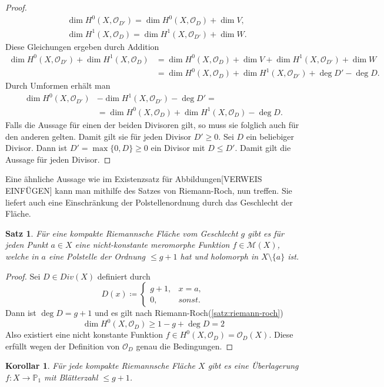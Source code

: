 \documentclass[11pt,a4paper]{scrartcl}
\theoremstyle{thm}
\newtheorem{satz}{Satz}[section]
\newtheorem{koro}{Korollar}[section]
\theoremstyle{def}
\theoremstyle{remark}
\begin{document}
\begin{proof}
\begin{align*}
&\dim H^0(X,\mathcal{O}_{D'})=\dim H^0(X,\mathcal{O}_D)+\dim V,\\
&\dim H^1(X,\mathcal{O}_D)=\dim H^1(X,\mathcal{O}_{D'})+\dim W.
\end{align*}
Diese Gleichungen ergeben durch Addition
\begin{align*}
	\dim H^0(X,\mathcal{O}_{D'})+\dim H^1(X,\mathcal{O}_D) &=\dim H^0(X,\mathcal{O}_D)+\dim V+\dim H^1(X,\mathcal{O}_{D'})+\dim W\\
	&=\dim H^0(X,\mathcal{O}_D)+\dim H^1(X,\mathcal{O}_{D'})+\deg D'-\deg D.
\end{align*}
Durch Umformen erhält man
\begin{align*}
\dim H^0(X,\mathcal{O}_{D'})&-\dim H^1(X,\mathcal{O}_{D'})-\deg D'=\\
							&=\dim H^0(X,\mathcal{O}_D)+\dim H^1(X,\mathcal{O}_D)-\deg D.	
\end{align*}
Falls die Aussage für einen der beiden Divisoren gilt, so muss sie folglich auch für den anderen gelten. Damit gilt sie für jeden Divisor $D'\geq 0$. Sei $D$ ein beliebiger Divisor. Dann ist $D'=\max \{0,D\}\geq 0$ ein Divisor mit $D\leq D'$. Damit gilt die Aussage für jeden Divisor.
\end{proof}
Eine ähnliche Aussage wie im Existenzsatz für Abbildungen[VERWEIS EINFÜGEN] kann man mithilfe des Satzes von Riemann-Roch, nun treffen. Sie liefert auch eine Einschränkung der Polstellenordnung durch das Geschlecht der Fläche.
\begin{satz}
	Für eine kompakte Riemannsche Fläche vom Geschlecht $g$ gibt es für jeden Punkt $a\in X$ eine nicht-konstante meromorphe Funktion $f\in \mathcal{M}(X)$, welche in $a$ eine Polstelle der Ordnung $\leq g+1$ hat und holomorph in $X\setminus\{a\}$ ist.
\end{satz} 
\begin{proof}
	Sei $D\in Div(X)$ definiert durch
	\[
		D(x)\coloneqq
	\begin{cases}
		g+1, &x=a,\\
		0, &sonst.
	\end{cases}
	\]
	Dann ist $\deg D = g+1$ und es gilt nach Riemann-Roch(\ref{satz:riemann-roch})
	\[
	\dim H^0(X,\mathcal{O}_D)\geq 1-g+\deg D=2 
	\]
	Also existiert eine nicht konstante Funktion $f\in H^0(X,\mathcal{O}_D)=\mathcal{O}_D(X)$. Diese erfüllt wegen der Definition von $\mathcal{O}_D$ genau die Bedingungen.
\end{proof}
\begin{koro}
	Für jede kompakte Riemannsche Fläche $X$ gibt es eine Überlagerung $f:X\rightarrow \mathbb{P}_1$ mit Blätterzahl $\leq g+1$.
	\end{koro}
\end{document}
